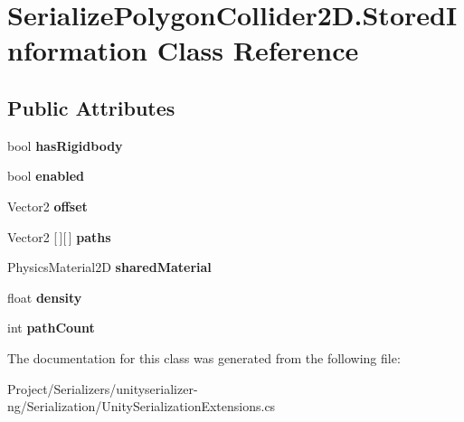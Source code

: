 \hypertarget{class_serialize_polygon_collider2_d_1_1_stored_information}{}\section{Serialize\+Polygon\+Collider2\+D.\+Stored\+Information Class Reference}
\label{class_serialize_polygon_collider2_d_1_1_stored_information}
\subsection*{Public Attributes}
\begin{DoxyCompactItemize}
\item 
\mbox{\label{class_serialize_polygon_collider2_d_1_1_stored_information_a1c7a606654c0a015b39ebe831647bbfb}} 
bool {\bfseries has\+Rigidbody}
\item 
\mbox{\label{class_serialize_polygon_collider2_d_1_1_stored_information_afe7b2bc01573d6b094b5300bcfbbf787}} 
bool {\bfseries enabled}
\item 
\mbox{\label{class_serialize_polygon_collider2_d_1_1_stored_information_a828b444f983866b61ce86adca9f98763}} 
Vector2 {\bfseries offset}
\item 
\mbox{\label{class_serialize_polygon_collider2_d_1_1_stored_information_aef277db9e98a3f1572925edd52bbdaaa}} 
Vector2 \mbox{[}$\,$\mbox{]}\mbox{[}$\,$\mbox{]} {\bfseries paths}
\item 
\mbox{\label{class_serialize_polygon_collider2_d_1_1_stored_information_a3bde1275cddf18a2b9d7a53a2d9d9ace}} 
Physics\+Material2D {\bfseries shared\+Material}
\item 
\mbox{\label{class_serialize_polygon_collider2_d_1_1_stored_information_a73a544fecaed039a5b45916b3480804f}} 
float {\bfseries density}
\item 
\mbox{\label{class_serialize_polygon_collider2_d_1_1_stored_information_a5a5b7f72e7e5ce39cd283a8e8a1d601e}} 
int {\bfseries path\+Count}
\end{DoxyCompactItemize}


The documentation for this class was generated from the following file\+:\begin{DoxyCompactItemize}
\item 
Project/\+Serializers/unityserializer-\/ng/\+Serialization/Unity\+Serialization\+Extensions.\+cs\end{DoxyCompactItemize}
